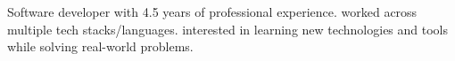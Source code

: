 
\begin{cventries}
  \cvsummary
    {Software developer with 4.5 years of professional experience. worked across multiple tech stacks/languages. interested in learning new technologies and tools while solving real-world problems.}
\end{cventries}